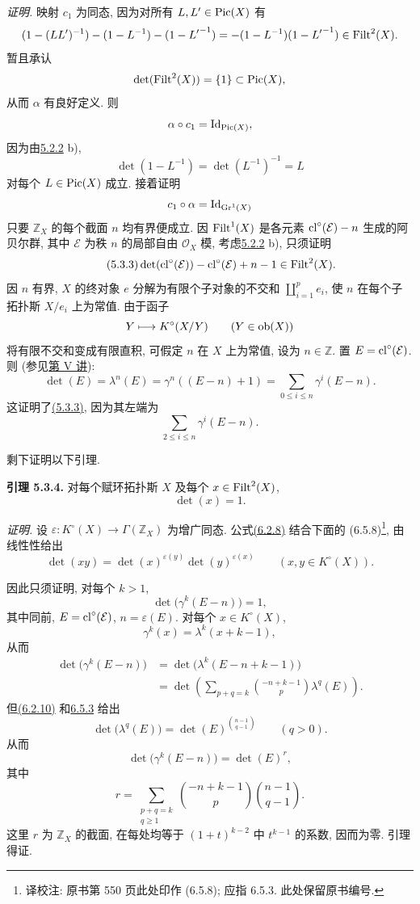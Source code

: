 \emph{证明.} 映射 $c_1$ 为同态, 因为对所有 $L,L'\in\operatorname{Pic}(X)$ 有
%
\[
(1-(LL')^{-1})-(1-L^{-1})-(1-{L'}^{-1})
=-(1-L^{-1})(1-{L'}^{-1})\in\operatorname{Filt}^2(X).
\]
暂且承认
\[
\det(\operatorname{Filt}^2(X))=\{1\}\subset\operatorname{Pic}(X),
\]
从而 $\alpha$ 有良好定义. 则
\[
\alpha\circ c_1=\operatorname{Id}_{\operatorname{Pic}(X)},
\]
因为由\hyperlink{sga6.e10.rem.5-2-2}{5.2.2} b),
\[
\det(1-L^{-1})=\det(L^{-1})^{-1}=L
\]
对每个 $L\in\operatorname{Pic}(X)$ 成立. 接着证明
\[
c_1\circ\alpha=\operatorname{Id}_{\operatorname{Gr}^1(X)}
\]
只要 $\mathbb Z_X$ 的每个截面 $n$ 均有界便成立. 因 $\operatorname{Filt}^1(X)$ 是各元素 $\operatorname{cl}^\circ(\mathcal E)-n$ 生成的阿贝尔群, 其中 $\mathcal E$ 为秩 $n$ 的局部自由 $\mathcal O_X$ 模, 考虑\hyperlink{sga6.e10.rem.5-2-2}{5.2.2} b), 只须证明
%
%
%
\begin{equation}\tag{5.3.3}
\det(\operatorname{cl}^\circ(\mathcal E))-\operatorname{cl}^\circ(\mathcal E)+n-1\in\operatorname{Filt}^2(X).
\end{equation}
因 $n$ 有界, $X$ 的终对象 $e$ 分解为有限个子对象的不交和 $\coprod_{i=1}^p e_i$, 使 $n$ 在每个子拓扑斯 $X/e_i$ 上为常值. 由于函子
%
%
\[
Y\longmapsto K^\circ(X/Y)\qquad(Y\in\operatorname{ob}(X))
\]
将有限不交和变成有限直积, 可假定 $n$ 在 $X$ 上为常值, 设为 $n\in\mathbb Z$. 置 $E=\operatorname{cl}^\circ(\mathcal E)$. 则 (参见\hyperlink{sga6.e05.expose}{第 V 讲}):
%
%
\[
\det(E)=\lambda^n(E)=\gamma^n((E-n)+1)
=\sum_{0\leq i\leq n}\gamma^i(E-n).
\]
这证明了\hyperlink{sga6.e10.eq.5-3-3}{(5.3.3)}, 因为其左端为
\[
\sum_{2\leq i\leq n}\gamma^i(E-n).
\]

剩下证明以下引理.

\textbf{引理 5.3.4.} 对每个赋环拓扑斯 $X$ 及每个 $x\in\operatorname{Filt}^2(X)$,
%
\[
\det(x)=1.
\]

\emph{证明.} 设 $\varepsilon:K^\circ(X)\to\Gamma(\mathbb Z_X)$ 为增广同态. 公式\hyperlink{sga6.e10.eq.6-2-8}{(6.2.8)} 结合下面的 (6.5.8)\footnote{译校注: 原书第 550 页此处印作 (6.5.8); 应指 6.5.3. 此处保留原书编号.}, 由线性性给出
%
%
\begin{equation}\tag{5.3.5}
\det(xy)=\det(x)^{\varepsilon(y)}\det(y)^{\varepsilon(x)}
\qquad(x,y\in K^\circ(X)).
\end{equation}

因此只须证明, 对每个 $k>1$,
\[
\det\bigl(\gamma^k(E-n)\bigr)=1,
\]
其中同前, $E=\operatorname{cl}^\circ(\mathcal E)$, $n=\varepsilon(E)$. 对每个 $x\in K^\circ(X)$,
%
\[
\gamma^k(x)=\lambda^k(x+k-1),
\]
从而
\[
\begin{aligned}
\det\bigl(\gamma^k(E-n)\bigr)
&=\det\bigl(\lambda^k(E-n+k-1)\bigr)\\
&=\det\left(
\sum_{p+q=k}\binom{-n+k-1}{p}\lambda^q(E)
\right).
\end{aligned}
\]
但\hyperlink{sga6.e10.eq.6-2-10}{(6.2.10)} 和\hyperlink{sga6.e10.para.6-5-3}{6.5.3} 给出
\[
\det\bigl(\lambda^q(E)\bigr)
=\det(E)^{\binom{n-1}{q-1}}
\qquad(q>0).
\]
从而
\[
\det\bigl(\gamma^k(E-n)\bigr)=\det(E)^r,
\]
其中
\[
r=\sum_{\substack{p+q=k\\q\geq1}}
\binom{-n+k-1}{p}\binom{n-1}{q-1}.
\]
这里 $r$ 为 $\mathbb Z_X$ 的截面, 在每处均等于 $(1+t)^{k-2}$ 中 $t^{k-1}$ 的系数, 因而为零. 引理得证.
%

